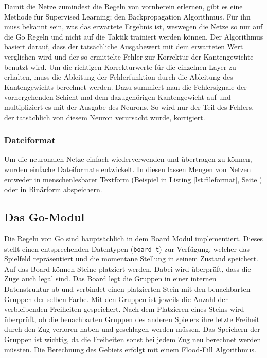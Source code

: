 Damit die Netze zumindest die Regeln von vornherein erlernen, gibt es eine
Methode für Supervised Learning; den Backpropagation
Algorithmus. Für ihn muss bekannt sein, was das erwartete Ergebnis ist, weswegen
die Netze so nur auf die Go Regeln und nicht auf die Taktik trainiert werden
können. Der Algorithmus basiert darauf, dass der tatsächliche Ausgabewert mit
dem erwarteten Wert verglichen wird und der so ermittelte Fehler zur Korrektur
der Kantengewichte benutzt wird. Um die richtigen Korrekturwerte für die
einzelnen Layer zu erhalten, muss die Ableitung der Fehlerfunktion durch die
Ableitung des Kantengewichts berechnet werden. Dazu summiert man die
Fehlersignale der vorhergehenden Schicht mal dem dazugehörigen Kantengewicht auf
und multipliziert es mit der Ausgabe des Neurons. So wird nur der Teil des
Fehlers, der tatsächlich von diesem Neuron verursacht wurde, korrigiert. 

\subsubsection{Dateiformat}
Um die neuronalen Netze einfach wiederverwenden und übertragen zu können,
wurden einfache Dateiformate entwickelt. In diesen lassen Mengen von Netzen
entweder in menschenlesbarer Textform (Beispiel in Listing
\ref{lst:fileformat}, Seite \pageref{lst:fileformat}) oder in Binärform
abspeichern.

\subsection{Das Go-Modul}

Die Regeln von Go sind hauptsächlich in dem Board Modul implementiert. Dieses
stellt einen entsprechenden Datentypen (\texttt{board\_t}) zur Verfügung,
welcher das Spielfeld repräsentiert und die momentane Stellung in seinem
Zustand speichert.  Auf das Board können Steine platziert werden. Dabei wird
überprüft, dass die Züge auch legal sind.  Das Board legt die Gruppen in einer
internen Datenstruktur ab und verbindet einen platzierten Stein mit den
benachbarten Gruppen der selben Farbe. Mit den Gruppen ist jeweils die Anzahl
der verbleibenden Freiheiten gespeichert.  Nach dem Platzieren eines Steins
wird überprüft, ob die benachbarten Gruppen des anderen Spielers ihre letzte
Freiheit durch den Zug verloren haben und geschlagen werden müssen.  Das
Speichern der Gruppen ist wichtig, da die Freiheiten sonst bei jedem Zug neu
berechnet werden müssten.
Die Berechnung des Gebiets erfolgt mit einem Flood-Fill Algorithmus.

